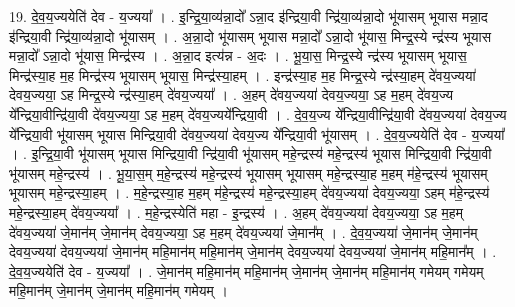 \documentclass[17pt]{extarticle}
\begin{document}
19. दे॒व॒य॒ज्ययेति॑ देव - य॒ज्यया᳚ । . इ॒न्द्रि॒या॒व्य॑न्ना॒दो᳚ ऽन्ना॒द इ॑न्द्रिया॒वी न्द्रि॑या॒व्य॑न्ना॒दो भू॑यासम् भूयास मन्ना॒द इ॑न्द्रिया॒वी न्द्रि॑या॒व्य॑न्ना॒दो भू॑यासम् । . अ॒न्ना॒दो भू॑यासम् भूयास मन्ना॒दो᳚ ऽन्ना॒दो भू॑यास॒ मिन्द्र॒स्ये न्द्र॑स्य भूयास मन्ना॒दो᳚ ऽन्ना॒दो भू॑यास॒ मिन्द्र॑स्य । . अ॒न्ना॒द इत्य॑न्न - अ॒दः । . भू॒या॒स॒ मिन्द्र॒स्ये न्द्र॑स्य भूयासम् भूयास॒ मिन्द्र॑स्या॒ह म॒ह मिन्द्र॑स्य भूयासम् भूयास॒ मिन्द्र॑स्या॒हम् । . इन्द्र॑स्या॒ह म॒ह मिन्द्र॒स्ये न्द्र॑स्या॒हम् दे॑वय॒ज्यया॑ देवय॒ज्यया॒ ऽह मिन्द्र॒स्ये न्द्र॑स्या॒हम् दे॑वय॒ज्यया᳚ । . अ॒हम् दे॑वय॒ज्यया॑ देवय॒ज्यया॒ ऽह म॒हम् दे॑वय॒ज्य ये᳚न्द्रिया॒वीन्द्रि॑या॒वी दे॑वय॒ज्यया॒ ऽह म॒हम् दे॑वय॒ज्यये᳚न्द्रिया॒वी । . दे॒व॒य॒ज्य ये᳚न्द्रिया॒वीन्द्रि॑या॒वी दे॑वय॒ज्यया॑ देवय॒ज्य ये᳚न्द्रिया॒वी भू॑यासम् भूयास मिन्द्रिया॒वी दे॑वय॒ज्यया॑ देवय॒ज्य ये᳚न्द्रिया॒वी भू॑यासम् । . दे॒व॒य॒ज्ययेति॑ देव - य॒ज्यया᳚ । . इ॒न्द्रि॒या॒वी भू॑यासम् भूयास मिन्द्रिया॒वी न्द्रि॑या॒वी भू॑यासम् महे॒न्द्रस्य॑ महे॒न्द्रस्य॑ भूयास मिन्द्रिया॒वी न्द्रि॑या॒वी भू॑यासम् महे॒न्द्रस्य॑ । . भू॒या॒स॒म् म॒हे॒न्द्रस्य॑ महे॒न्द्रस्य॑ भूयासम् भूयासम् महे॒न्द्रस्या॒ह म॒हम् म॑हे॒न्द्रस्य॑ भूयासम् भूयासम् महे॒न्द्रस्या॒हम् । . म॒हे॒न्द्रस्या॒ह म॒हम् म॑हे॒न्द्रस्य॑ महे॒न्द्रस्या॒हम् दे॑वय॒ज्यया॑ देवय॒ज्यया॒ ऽहम् म॑हे॒न्द्रस्य॑ महे॒न्द्रस्या॒हम् दे॑वय॒ज्यया᳚ । . म॒हे॒न्द्रस्येति॑ महा - इ॒न्द्रस्य॑ । . अ॒हम् दे॑वय॒ज्यया॑ देवय॒ज्यया॒ ऽह म॒हम् दे॑वय॒ज्यया॑ जे॒मान॑म् जे॒मान॑म् देवय॒ज्यया॒ ऽह म॒हम् दे॑वय॒ज्यया॑ जे॒मान᳚म् । . दे॒व॒य॒ज्यया॑ जे॒मान॑म् जे॒मान॑म् देवय॒ज्यया॑ देवय॒ज्यया॑ जे॒मान॑म् महि॒मान॑म् महि॒मान॑म् जे॒मान॑म् देवय॒ज्यया॑ देवय॒ज्यया॑ जे॒मान॑म् महि॒मान᳚म् । . दे॒व॒य॒ज्ययेति॑ देव - य॒ज्यया᳚ । . जे॒मान॑म् महि॒मान॑म् महि॒मान॑म् जे॒मान॑म् जे॒मान॑म् महि॒मान॑म् गमेयम् गमेयम् महि॒मान॑म् जे॒मान॑म् जे॒मान॑म् महि॒मान॑म् गमेयम् । \newline
\end{document}
